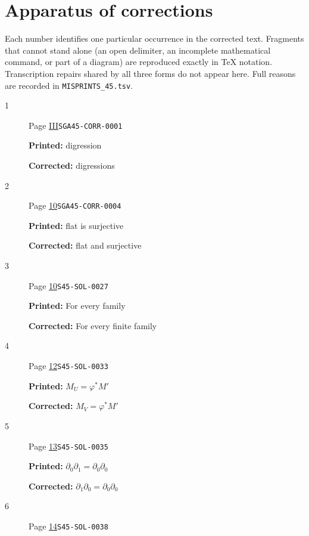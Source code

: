 \ifnum{}\relax
\clearpage
\chapter*{Apparatus of corrections}
Each number identifies one particular occurrence in the corrected text. Fragments that cannot stand alone (an open delimiter, an incomplete mathematical command, or part of a diagram) are reproduced exactly in TeX notation. Transcription repairs shared by all three forms do not appear here. Full reasons are recorded in \texttt{MISPRINTS\_45.tsv}.
\begingroup\small
\begin{description}
\item[\hypertarget{apparatus:EN-0001}{1}] Page \hyperlink{printpage:en:III}{III}\quad\texttt{SGA45-CORR-0001}
\par\noindent\textbf{Printed:} digression
\par\noindent\textbf{Corrected:} digressions
\smallskip
\item[\hypertarget{apparatus:EN-0002}{2}] Page \hyperlink{printpage:en:10}{10}\quad\texttt{SGA45-CORR-0004}
\par\noindent\textbf{Printed:} flat is surjective
\par\noindent\textbf{Corrected:} flat and surjective
\smallskip
\item[\hypertarget{apparatus:EN-0003}{3}] Page \hyperlink{printpage:en:10}{10}\quad\texttt{S45-SOL-0027}
\par\noindent\textbf{Printed:} For every family
\par\noindent\textbf{Corrected:} For every finite family
\smallskip
\item[\hypertarget{apparatus:EN-0004}{4}] Page \hyperlink{printpage:en:12}{12}\quad\texttt{S45-SOL-0033}
\par\noindent\textbf{Printed:} \(M_U=\varphi^*M'\)
\par\noindent\textbf{Corrected:} \(M_V=\varphi^*M'\)
\smallskip
\item[\hypertarget{apparatus:EN-0005}{5}] Page \hyperlink{printpage:en:13}{13}\quad\texttt{S45-SOL-0035}
\par\noindent\textbf{Printed:} \(\partial_0\partial_1=\partial_0\partial_0\)
\par\noindent\textbf{Corrected:} \(\partial_1\partial_0=\partial_0\partial_0\)
\smallskip
\item[\hypertarget{apparatus:EN-0006}{6}] Page \hyperlink{printpage:en:14}{14}\quad\texttt{S45-SOL-0038}

\end{description}

